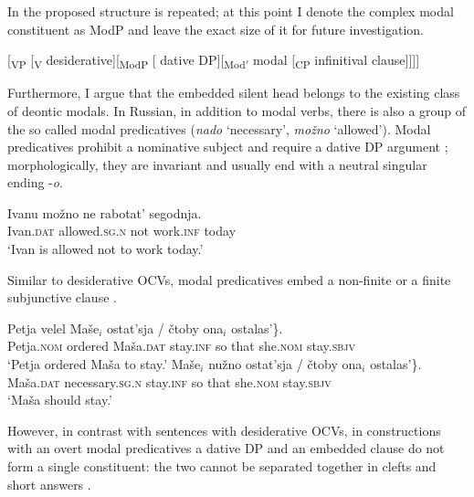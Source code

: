 \documentclass[output=paper,
colorlinks,
citecolor=brown,
newtxmath
]{langscibook}
\begin{document}
\noindent In  the proposed structure is repeated; at this point I denote the complex modal constituent as ModP and leave the exact size of it for future investigation. 

\ea\label{ex19} 
{[\textsubscript{VP} [\textsubscript{V} desiderative][\textsubscript{ModP} [\hspace{-2pt} dative DP][\textsubscript{Mod$'$} modal [\textsubscript{CP} infinitival clause]]]]}
\z

\noindent Furthermore, I argue that the embedded silent head belongs to the existing class of deontic modals. In Russian, in addition to modal verbs, there is also a group of the so called modal predicatives (\textit{nado} `necessary’, \textit{možno} `allowed’). Modal predicatives prohibit a nominative subject and require a dative DP argument ; morphologically, they are invariant and usually end with a neutral singular ending -\textit{o}.

\ea\label{ex20} 
\gll Ivanu možno ne rabotat’ segodnja.\\ 
    Ivan.\textsc{dat} allowed.\textsc{sg.n} not work.\textsc{inf} today\\
\glt `Ivan is allowed not to work today.'
\z

\noindent Similar to desiderative OCVs, modal predicatives embed a non-finite or a finite subjunctive clause .

\ea\label{ex21}
\ea\label{ex21a} 
\gll Petja velel Maše$_i$ \minsp{\{} ostat’sja / čtoby ona$_i$ ostalas’\}.\\ 
    Petja.\textsc{nom} ordered Maša.\textsc{dat} {} stay.\textsc{inf} {} {so that} she.\textsc{nom} stay.\textsc{sbjv}\\
\glt `Petja ordered Maša to stay.'
\ex\label{ex21b}
\gll Maše$_i$ nužno \minsp{\{} ostat’sja / čtoby ona$_i$ ostalas’\}.\\ 
    Maša.\textsc{dat} necessary.\textsc{sg.n} {} stay.\textsc{inf} {} {so that} she.\textsc{nom} stay.\textsc{sbjv}\\
\glt `Maša should stay.'
\z
\z

\noindent However, in contrast with sentences with desiderative OCVs, in constructions with an overt modal predicatives a dative DP and an embedded clause do not form a single constituent: the two cannot be separated together in clefts  and short answers .

\z
\end{document}

